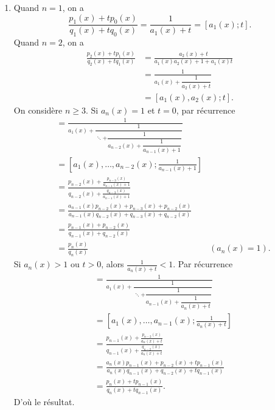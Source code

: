\documentclass[french]{article}
\theoremstyle{definition}
\newcommand{\cin}[1]{\left[#1\right]}
\begin{document}
\begin{enumerate}
\begin{enumerate}
        \item \label{Partie4b} Quand $n = 1$, on a
            $$\frac{p_1(x) + tp_0(x)}{q_1(x) + tq_0(x)} = \frac{1}{a_1(x) + t} = [a_1(x);t].$$
        Quand $n = 2$, on a
            \begin{align*}
                \frac{p_2(x) + tp_1(x)}{q_2(x) + tq_1(x)} & = \frac{a_2(x) + t}{a_1(x)a_2(x) + 1 + a_1(x)t} \\
                & = \frac{1}{a_1(x) + \dfrac{1}{a_2(x) + t}} \\
                & = [a_1(x),a_2(x);t].
            \end{align*}
        On consid\`ere $n \ge 3$. Si $a_n(x) = 1$ et $t = 0$, par r\'ecurrence
            \begin{align*}
                [a_1(x),\ldots,a_{n-1}(x),1;0] & = \frac{1}{a_1(x) + \dfrac{1}{\ddots + \dfrac{1}{a_{n-2}(x) + \dfrac{1}{a_{n-1}(x) + 1}}}} \\
                & = \cin{a_1(x),\ldots,a_{n-2}(x); \tfrac{1}{a_{n-1}(x) + 1}}\\
                & = \frac{p_{n-2}(x) + \tfrac{p_{n-3}(x)}{a_{n-1}(x) + 1}}{q_{n-2}(x) + \tfrac{q_{n-3}(x)}{a_{n-1}(x) + 1}} \\
                & = \frac{a_{n-1}(x)p_{n-2}(x) + p_{n-3}(x) + p_{n-2}(x)}{a_{n-1}(x)q_{n-2}(x) + q_{n-3}(x) + q_{n-2}(x)} \\
                & = \frac{p_{n-1}(x) + p_{n-2}(x)}{q_{n-1}(x) + q_{n-2}(x)}\\
                & = \frac{p_{n}(x)}{q_n(x)} & (a_n(x) = 1).
            \end{align*}
        Si $a_n(x) > 1$ ou $t > 0$, alors $\tfrac{1}{a_n(x) + t} < 1$. Par r\'ecurrence
            \begin{align*}
                [a_1(x),\ldots,a_{n}(x);t] & = \frac{1}{a_1(x) + \dfrac{1}{\ddots + \dfrac{1}{a_{n-1}(x) + \dfrac{1}{a_{n}(x) + t}}}} \\
                & = \cin{a_1(x),\ldots,a_{n-1}(x); \tfrac{1}{a_{n}(x) + t}}\\
                & = \frac{p_{n-1}(x) + \tfrac{p_{n-2}(x)}{a_{n}(x) + t}}{q_{n-1}(x) + \tfrac{q_{n-2}(x)}{a_{n}(x) + t}} \\
                & = \frac{a_{n}(x)p_{n-1}(x) + p_{n-2}(x) + tp_{n-1}(x)}{a_{n}(x)q_{n-1}(x) + q_{n-2}(x) + tq_{n-1}(x)} \\
                & = \frac{p_{n}(x) + tp_{n-1}(x)}{q_{n}(x) + tq_{n-1}(x)}.
            \end{align*}
        D'o\`u le r\'esultat.
        

\end{enumerate}
\end{enumerate}
\end{document}
